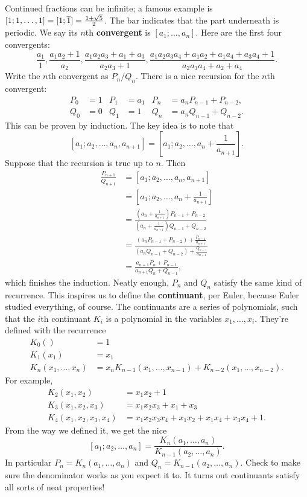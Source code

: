 \documentclass[11pt,paper=letter]{scrartcl}
\begin{document}
Continued fractions can be infinite; a famous example is $[1; 1, \ldots, 1] = [1; \overline{1}] = \frac{1 + \sqrt5}{2}$. The bar indicates that the part underneath is periodic. We say its $n$th \textbf{convergent} is $[a_1; \ldots, a_n]$. Here are the first four convergents: \[
  \frac{a_1}{1},
  \frac{a_1a_2 + 1}{a_2},
  \frac{a_1a_2a_3 + a_1 + a_3}{a_2a_3 + 1},
  \frac{a_1a_2a_3a_4 + a_1a_2 + a_1a_4 + a_3a_4 + 1}{a_2a_3a_4 + a_2 + a_4}.
\]
Write the $n$th convergent as $P_n/Q_n$. There is a nice recursion for the $n$th convergent:
\begin{align*}
P_0 &= 1 & P_1 &= a_1 & P_n &= a_n P_{n-1} + P_{n-2}, \\
Q_0 &= 0 & Q_1 &= 1 & Q_n &= a_n Q_{n-1} + Q_{n-2}.
\end{align*}
This can be proven by induction. The key idea is to note that \[
  [a_1; a_2, \ldots, a_n, a_{n+1}]
  = \left[a_1; a_2, \ldots, a_n + \frac{1}{a_{n+1}}\right].
\]
Suppose that the recursion is true up to $n$. Then
\begin{align*}
\frac{P_{n+1}}{Q_{n+1}}
&= [a_1; a_2, \ldots, a_n, a_{n+1}] \\
&= \left[a_1; a_2, \ldots, a_n + \frac{1}{a_{n+1}}\right] \\
&= \frac{\left(a_n + \frac{1}{a_{n+1}}\right)P_{n-1} + P_{n-2}}{\left(a_n + \frac{1}{a_{n+1}}\right)Q_{n-1} + Q_{n-2}} \\
&= \frac{(a_n P_{n-1} + P_{n-2}) + \frac{P_{n-1}}{a_{n+1}}}{(a_n Q_{n-1} + Q_{n-2}) + \frac{Q_{n-1}}{a_{n+1}}} \\
&= \frac{a_{n+1} P_n + P_{n-1}}{a_{n+1} Q_n + Q_{n-1}},
\end{align*}
which finishes the induction. Neatly enough, $P_n$ and $Q_n$ satisfy the same kind of recurrence. This inspires us to define the \textbf{continuant}, per Euler, because Euler studied everything, of course. The continuants are a series of polynomials, such that the $i$th continuant $K_i$ is a polynomial in the variables $x_1, \ldots, x_i$. They're defined with the recurrence
\begin{align*}
K_0() &= 1 \\
K_1(x_1) &= x_1 \\
K_n(x_1, \ldots, x_n) &= x_n K_{n-1}(x_1, \ldots, x_{n-1}) + K_{n-2}(x_1, \ldots, x_{n-2}).
\end{align*}
For example,
\begin{align*}
K_2(x_1, x_2) &= x_1x_2 + 1 \\
K_3(x_1, x_2, x_3) &= x_1x_2x_3 + x_1 + x_3 \\
K_4(x_1, x_2, x_3, x_4) &= x_1x_2x_3x_4 + x_1x_2 + x_1x_4 + x_3x_4 + 1.
\end{align*}
From the way we defined it, we get the nice \[
  [a_1; a_2, \ldots, a_n] = \frac{K_{n}(a_1, \ldots, a_n)}{K_{n-1}(a_2, \ldots, a_{n})}.
\]
In particular $P_n = K_n(a_1, \ldots, a_n)$ and $Q_n = K_{n-1}(a_2, \ldots, a_n)$. Check to make sure the denominator works as you expect it to. It turns out continuants satisfy all sorts of neat properties!
\end{document}

